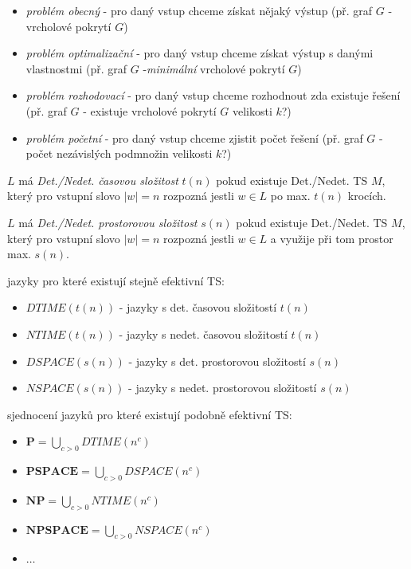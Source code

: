\documentclass[a4paper]{article}      %
\newenvironment{definition}[1][Definice]{\begin{trivlist}
\item[\hskip \labelsep {\bfseries #1}]}{\end{trivlist}}
\begin{document}
\begin{definition}[Klasifikace problémů]
\begin{itemize}
\item \emph{problém obecný} - pro daný vstup chceme získat nějaký výstup (př. graf $G$ - vrcholové pokrytí $G$)
\item \emph{problém optimalizační} - pro daný vstup chceme získat výstup s danými vlastnostmi (př. graf $G$ -\emph{minimální} vrcholové pokrytí $G$)
\item \emph{problém rozhodovací} - pro daný vstup chceme rozhodnout zda existuje řešení (př. graf $G$ - existuje vrcholové pokrytí $G$ velikosti $k$?)
\item \emph{problém početní} - pro daný vstup chceme zjistit počet řešení (př. graf $G$ - počet nezávislých podmnožin velikosti $k$?)
\end{itemize}
\end{definition}

\begin{definition}[Det./Nedet. časová složitost jazyka]
$L$ má \emph{Det./Nedet. časovou složitost} $t(n)$ pokud existuje Det./Nedet. TS $M$,
který pro vstupní slovo $|w|=n$ rozpozná jestli $w \in L$ po max. $t(n)$ krocích.\\
\end{definition}

\begin{definition}[Det./Nedet. prostorová složitost jazyka]
$L$ má \emph{Det./Nedet. prostorovou složitost} $s(n)$ pokud existuje Det./Nedet. TS $M$,
který pro vstupní slovo $|w|=n$ rozpozná jestli $w \in L$ a využije při tom prostor max. $s(n)$.
\end{definition}

\begin{definition}[Množiny jazyků:]
jazyky pro které existují stejně efektivní TS:
\begin{itemize}
\item $DTIME(t(n))$ - jazyky s det. časovou složitostí $t(n)$
\item $NTIME(t(n))$ - jazyky s nedet. časovou složitostí $t(n)$
\item $DSPACE(s(n))$ - jazyky s det. prostorovou složitostí $s(n)$
\item $NSPACE(s(n))$ - jazyky s nedet. prostorovou složitostí $s(n)$
\end{itemize}
\end{definition}

\begin{definition}[Složitostní třídy:]
sjednocení jazyků pro které existují podobně efektivní TS:
\begin{itemize}
\item $\mathbf{P} = \bigcup_{c>0} DTIME(n^{c})$
\item $\mathbf{PSPACE} = \bigcup_{c>0} DSPACE(n^{c})$
\item $\mathbf{NP} = \bigcup_{c>0} NTIME(n^{c})$
\item $\mathbf{NPSPACE} = \bigcup_{c>0} NSPACE(n^{c})$
\item $\ldots$
\end{itemize}
\end{definition}
\end{document}
